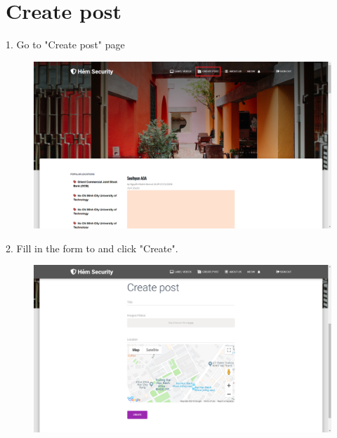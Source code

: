 \section{Create post}
1. Go to "Create post" page
\begin{center}
	\begin{figure}[H]
		\centering
		\includegraphics[width=1\columnwidth]{images/chap6/instruction7.png}
	\end{figure}
\end{center}
2. Fill in the form to and click "Create". 
\begin{center}
	\begin{figure}[H]
		\centering
		\includegraphics[width=1\columnwidth]{images/chap6/instruction8.png}
	\end{figure}
\end{center}
